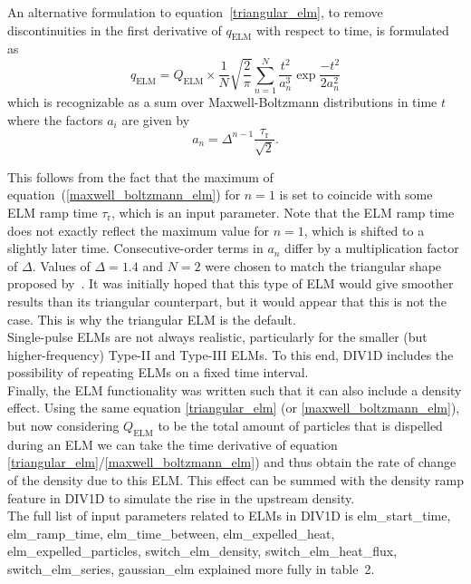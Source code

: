 \documentclass[amsmath,amssymb,a4]{revtex4-2}
\begin{document}
An alternative formulation to equation~\ref{triangular_elm}, to remove discontinuities in the first derivative of $q_{\mathrm{ELM}}$ with respect to time, is formulated as
\begin{equation}
\label{maxwell_boltzmann_elm}
q_{\mathrm{ELM}} = Q_{\mathrm{ELM}}\times
\frac{1}{N}\sqrt{\frac{2}{\pi}}
\sum_{n=1}^{N} \frac{t^2}{a_{n}^3}\exp{\frac{-t^2}{2a_n^2}}
\end{equation}
which is recognizable as a sum over Maxwell-Boltzmann distributions in time $t$ where the factors $a_i$ are given by
\begin{equation}
\label{maxwell_boltzmann_elm_a}
a_n = \Delta^{n-1}\frac{\tau_{\mathrm{r}}}{\sqrt{2}}.
\end{equation}

This follows from the fact that the maximum of equation~(\ref{maxwell_boltzmann_elm}) for $n=1$ is set to coincide with some ELM ramp time $\tau_{\mathrm{r}}$, which is an input parameter. Note that the ELM ramp time does not exactly reflect the maximum value for $n=1$, which is shifted to a slightly later time. Consecutive-order terms in $a_n$ differ by a multiplication factor of $\Delta$. Values of $\Delta=1.4$ and $N=2$ were chosen to match the triangular shape proposed by~\cite{eich2017}. It was initially hoped that this type of ELM would give smoother results than its triangular counterpart, but it would appear that this is not the case. This is why the triangular ELM is the default.\\

Single-pulse ELMs are not always realistic, particularly for the smaller (but higher-frequency) Type-II and Type-III ELMs. To this end, DIV1D includes the possibility of repeating ELMs on a fixed time interval.\\

Finally, the ELM functionality was written such that it can also include a density effect. Using the same equation \ref{triangular_elm} (or \ref{maxwell_boltzmann_elm}), but now considering $Q_{\mathrm{ELM}}$ to be the total amount of particles that is dispelled during an ELM we can take the time derivative of equation \ref{triangular_elm}/\ref{maxwell_boltzmann_elm}) and thus obtain the rate of change of the density due to this ELM. This effect can be summed with the density ramp feature in DIV1D to simulate the rise in the upstream density.\\

The full list of input parameters related to ELMs in DIV1D is
elm\_start\_time,
elm\_ramp\_time,
elm\_time\_between,
elm\_expelled\_heat,
elm\_expelled\_particles,
switch\_elm\_density,
switch\_elm\_heat\_flux,
switch\_elm\_series,
gaussian\_elm
explained more fully in table~2.
\end{document}
